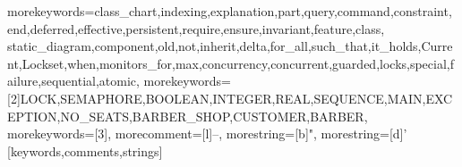 \usepackage{color}
\usepackage{listings}



 {
  morekeywords={class_chart,indexing,explanation,part,query,command,constraint,
  end,deferred,effective,persistent,require,ensure,invariant,feature,class,
  static_diagram,component,old,not,inherit,delta,for_all,such_that,it_holds,Current,Lockset,when,monitors_for,max,concurrency,concurrent,guarded,locks,special,failure,sequential,atomic},
  morekeywords={[2]LOCK,SEMAPHORE,BOOLEAN,INTEGER,REAL,SEQUENCE,MAIN,EXCEPTION,NO_SEATS,BARBER_SHOP,CUSTOMER,BARBER},
  morekeywords={[3]},
  morecomment=[l]{--}, morestring=[b]", morestring=[d]'
  }[keywords,comments,strings]


